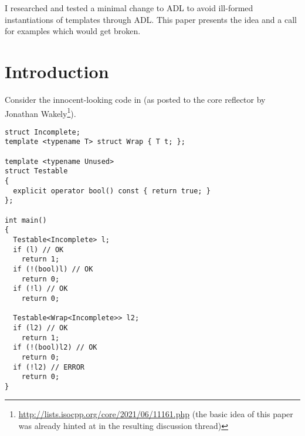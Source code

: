 \newcommand\wgTitle{A minimal ADL restriction to avoid ill-formed template instantiation}
\newcommand\wgName{Matthias Kretz <m.kretz@gsi.de>}
\newcommand\wgDocumentNumber{DMADLR0}
\newcommand\wgGroup{EWG}
\newcommand\wgTarget{\CC{}26}

\usepackage{mymacros}
\usepackage{wg21}
\usepackage{changelog}
\usepackage{underscore}



\newcommand\wglink[1]{\href{https://wg21.link/#1}{#1}}
\newcommand\notyetinstantiated{not\hyp{}yet\hyp{}instantiated\hyp{}templates\xspace}


\begin{wgTitlepage}
  I researched and tested a minimal change to ADL to avoid ill-formed instantiations of 
  templates through ADL. This paper presents the idea and a call for examples which would 
  get broken.
\end{wgTitlepage}

\pagestyle{scrheadings}

%

%

\section{Introduction}

Consider the innocent-looking code in  (as posted to the core reflector by 
Jonathan Wakely\footnote{\url{http://lists.isocpp.org/core/2021/06/11161.php} (the basic 
idea of this paper was already hinted at in the resulting discussion thread)}).
\begin{lstlisting}[style=Vc,float,label=lst:example1,caption={
Ill-formed instantiation of \type{Wrap<Incomplete>} because of ADL
}]
struct Incomplete;
template <typename T> struct Wrap { T t; };

template <typename Unused>
struct Testable
{
  explicit operator bool() const { return true; }
};

int main()
{
  Testable<Incomplete> l;
  if (l) // OK
    return 1;
  if (!(bool)l) // OK
    return 0;
  if (!l) // OK
    return 0;

  Testable<Wrap<Incomplete>> l2;
  if (l2) // OK
    return 1;
  if (!(bool)l2) // OK
    return 0;
  if (!l2) // ERROR
    return 0;
}
\end{lstlisting}

